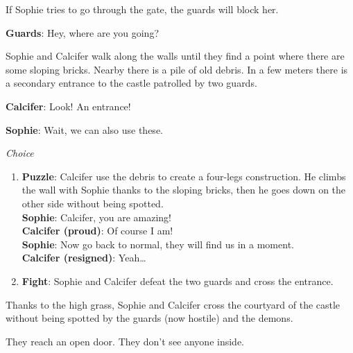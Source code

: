 If Sophie tries to go through the gate, the guards will block her.

\textbf{Guards}: Hey, where are you going?


Sophie and Calcifer walk along the walls until they find a point where there are some sloping bricks. Nearby there is a pile of old debris.
In a few meters there is a secondary entrance to the castle patrolled by two guards.

\textbf{Calcifer}: Look! An entrance!

\textbf{Sophie}: Wait, we can also use these.

\textit{Choice}
\begin{enumerate}
  \item \textbf{Puzzle}: Calcifer use the debris to create a four-legs construction. He climbs the wall with Sophie thanks to the sloping bricks, then he goes down on the other side without being spotted.\\
  \textbf{Sophie}: Calcifer, you are amazing!\\
\textbf{Calcifer (proud)}: Of course I am!\\
\textbf{Sophie}: Now go back to normal, they will find us in a moment.\\
\textbf{Calcifer (resigned)}: Yeah…
  \item \textbf{Fight}: Sophie and Calcifer defeat the two guards and cross the entrance.
\end{enumerate}


Thanks to the high grass, Sophie and Calcifer cross the courtyard of the castle without being spotted by the guards (now hostile) and the demons.

They reach an open door. They don’t see anyone inside.


